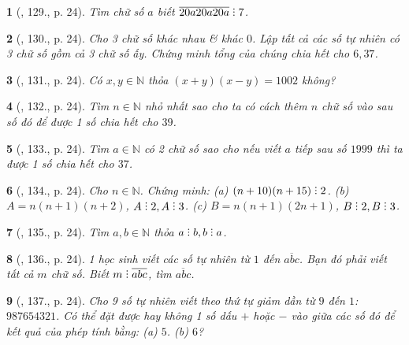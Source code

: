 \documentclass{article}
\newtheorem{baitoan}{}
\DeclareRobustCommand{\divby}{%
	\mathrel{\vbox{\baselineskip.65ex\lineskiplimit0pt\hbox{.}\hbox{.}\hbox{.}}}%
}
\begin{document}
\begin{baitoan}[\cite{Binh_Toan_6_tap_1}, 129., p. 24]
	Tìm chữ số $a$ biết $\overline{20a20a20a}\divby7$.
\end{baitoan}

\begin{baitoan}[\cite{Binh_Toan_6_tap_1}, 130., p. 24]
	Cho 3 chữ số khác nhau \& khác $0$. Lập tất cả các số tự nhiên có 3 chữ số gồm cả 3 chữ số ấy. Chứng minh tổng của chúng chia hết cho $6,37$.
\end{baitoan}

\begin{baitoan}[\cite{Binh_Toan_6_tap_1}, 131., p. 24]
	Có $x,y\in\mathbb{N}$ thỏa $(x + y)(x - y) = 1002$ không?
\end{baitoan}

\begin{baitoan}[\cite{Binh_Toan_6_tap_1}, 132., p. 24]
	Tìm $n\in\mathbb{N}$ nhỏ nhất sao cho ta có cách thêm $n$ chữ số vào sau số đó để được 1 số chia hết cho $39$.
\end{baitoan}

\begin{baitoan}[\cite{Binh_Toan_6_tap_1}, 133., p. 24]
	Tìm $a\in\mathbb{N}$ có 2 chữ số sao cho nếu viết $a$ tiếp sau số $1999$ thì ta được 1 số chia hết cho $37$.
\end{baitoan}

\begin{baitoan}[\cite{Binh_Toan_6_tap_1}, 134., p. 24]
	Cho $n\in\mathbb{N}$. Chứng minh: (a) $(n + 10)(n + 15)\divby2$. (b) $A = n(n + 1)(n + 2)$, $A\divby2,A\divby3$. (c) $B = n(n + 1)(2n + 1)$, $B\divby2,B\divby3$.
\end{baitoan}

\begin{baitoan}[\cite{Binh_Toan_6_tap_1}, 135., p. 24]
	Tìm $a,b\in\mathbb{N}$ thỏa $a\divby b,b\divby a$.
\end{baitoan}

\begin{baitoan}[\cite{Binh_Toan_6_tap_1}, 136., p. 24]
	1 học sinh viết các số tự nhiên từ $1$ đến $\overline{abc}$. Bạn đó phải viết tất cả $m$ chữ số. Biết $m\divby\overline{abc}$, tìm $\overline{abc}$.
\end{baitoan}

\begin{baitoan}[\cite{Binh_Toan_6_tap_1}, 137., p. 24]
	Cho 9 số tự nhiên viết theo thứ tự giảm dần từ $9$ đến $1$: $987654321$. Có thể đặt được hay không 1 số dấu $+$ hoặc $-$ vào giữa các số đó để kết quả của phép tính bằng: (a) $5$. (b) $6$?
\end{baitoan}
\end{document}
